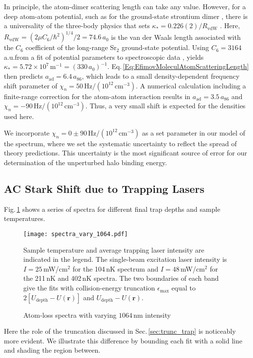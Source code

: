 In principle, the atom-dimer scattering length can take any value.
However, for a deep atom-atom potential, such as for the ground-state strontium dimer \cite{Stein2010}, there is a universality of the three-body physics that sets $\kappa_*=0.226(2)/R_{\mathrm{vdW}}$ \cite{wie12}.
Here, $R_{\mathrm{vdW}}=\left({2\mu C_6}/{\hbar^2}\right)^{1/4}/2=74.6$\,$a_0$ is the van der Waals length associated with the $C_6$ coefficient of the long-range Sr$_2$ ground-state potential.
Using $C_6=3164$a.u.\;from a fit of potential parameters to spectroscopic data \cite{Stein2010}, yields $\kappa_*=5.72\times 10^7$\,m$^{-1}=(330\,a_0)^{-1}$.
Eq.\,\ref{Eq:EfimovMoleculAtomScatteringLength} then predicts $a_{\text{ad}}=6.4\, a_{86}$, which leads to a small density-dependent frequency shift parameter of $\chi_n=50\,\mathrm{Hz}/(10^{12}\,\mathrm{cm}^{-3})$.
A numerical calculation including a finite-range correction for the atom-atom interaction \cite{mwc17} results in $a_{\text{ad}}=3.5\, a_{86}$ and $\chi_n=-90\,\mathrm{Hz}/(10^{12}\,\mathrm{cm}^{-3})$.
Thus, a very small shift is expected for the densities used here.

We incorporate $\chi_n=0\pm 90 \,\mathrm{Hz}/(10^{12}\,\mathrm{cm}^{-3})$ as a set parameter in our model of the spectrum, where we set the systematic uncertainty to reflect the spread of theory predictions.
This uncertainty is the most significant source of error for our determination of the unperturbed halo binding energy.

\subsection{AC Stark Shift due to Trapping Lasers}
Fig.\,\ref{fig:Spectraminus9MHzVaryTrapCold} shows a series of spectra for different final trap depths and sample temperatures.
	\begin{figure}
	 \centerline{
	 \texttt{[image: spectra\_vary\_1064.pdf]}}
  \caption{Atom-loss spectra with varying $1064$\,nm intensity}{Sample temperature and average trapping laser intensity are indicated in the legend. The single-beam excitation laser intensity is $I=25$\,mW/cm$^{2}$ for the 104\,nK spectrum and $I=48$\,mW/cm$^{2}$ for the 211\,nK and 402\,nK spectra. The two boundaries of each band give the fits with collision-energy truncation
$\epsilon_{\text{max}}$ equal to $2[U_{\text{depth}}-U(\mathbf{r})]$ and $U_{\text{depth}}-U(\mathbf{r})$.}
  	\label{fig:Spectraminus9MHzVaryTrapCold}
	\end{figure}
Here the role of the truncation discussed in Sec.\,\ref{sec:trunc_trap} is noticeably more evident.
We illustrate this difference by bounding each fit with a solid line and shading the region between.

